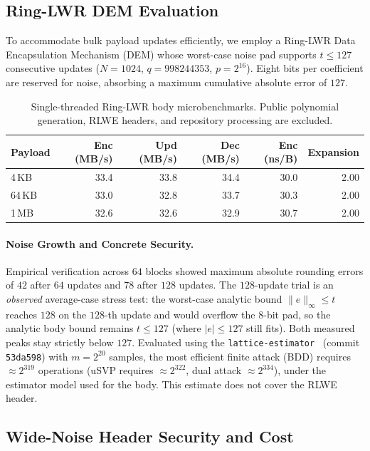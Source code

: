 \subsection{Ring-LWR DEM Evaluation}
\label{sec:eval_rlwr}

To accommodate bulk payload updates efficiently, we employ a Ring-LWR Data Encapsulation Mechanism (DEM) whose worst-case noise pad supports $t\le 127$ consecutive updates ($N=1024$, $q=998244353$, $p=2^{16}$). Eight bits per coefficient are reserved for noise, absorbing a maximum cumulative absolute error of $127$.

\begin{table}[htbp]
\centering
\caption{Single-threaded Ring-LWR body microbenchmarks. Public polynomial generation, RLWE headers, and repository processing are excluded.}
\label{tab:rlwr}
\small
\begin{tabular}{@{}lrrrrr@{}}
\toprule
Payload & Enc (MB/s) & Upd (MB/s) & Dec (MB/s) & Enc (ns/B) & Expansion \\
\midrule
4\,KB  & 33.4 & 33.8 & 34.4 & 30.0 & 2.00 \\
64\,KB & 33.0 & 32.8 & 33.7 & 30.3 & 2.00 \\
1\,MB  & 32.6 & 32.6 & 32.9 & 30.7 & 2.00 \\
\bottomrule
\end{tabular}
\end{table}

\paragraph{Noise Growth and Concrete Security.}
Empirical verification across $64$ blocks showed maximum absolute rounding errors of $42$ after $64$ updates and $78$ after $128$ updates.
The $128$-update trial is an \emph{observed} average-case stress test: the worst-case analytic bound $\|e\|_\infty\le t$ reaches $128$ on the $128$-th update and would overflow the $8$-bit pad, so the analytic body bound remains $t\le 127$ (where $|e|\le 127$ still fits).
Both measured peaks stay strictly below $127$.
Evaluated using the \texttt{lattice-estimator}~\cite{APS15} (commit \texttt{53da598}) with $m=2^{20}$ samples, the most efficient finite attack (BDD) requires $\approx 2^{319}$ operations (uSVP requires $\approx 2^{322}$, dual attack $\approx 2^{334}$), under the estimator model used for the body. This estimate does not cover the RLWE header.

\subsection{Wide-Noise Header Security and Cost}
\label{sec:header-parameters}

